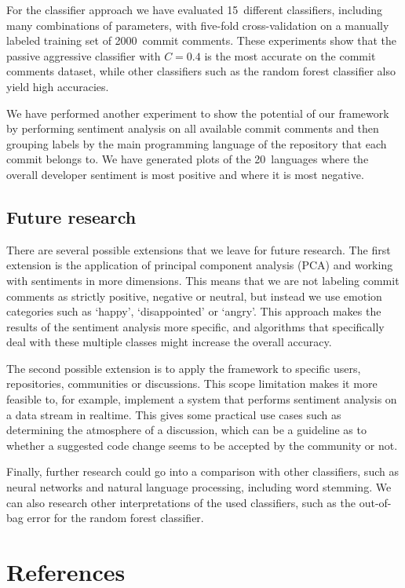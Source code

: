 \documentclass{article}
\begin{document}
For the classifier approach we have evaluated 15~different classifiers,
including many combinations of parameters, with five-fold cross-validation on
a manually labeled training set of 2000~commit comments. These experiments show
that the passive aggressive classifier with $C = 0.4$ is the most accurate on 
the commit comments dataset, while other classifiers such as the random forest 
classifier also yield high accuracies.

We have performed another experiment to show the potential of our framework by
performing sentiment analysis on all available commit comments and then grouping
labels by the main programming language of the repository that each commit
belongs to. We have generated plots of the 20~languages where the overall
developer sentiment is most positive and where it is most negative.

\subsection{Future research}\label{sec:future-research}
There are several possible extensions that we leave for future research. The
first extension is the application of principal component analysis (PCA) and
working with sentiments in more dimensions. This means that we are not labeling
commit comments as strictly positive, negative or neutral, but instead we use
emotion categories such as `happy', `disappointed' or `angry'. This approach
makes the results of the sentiment analysis more specific, and algorithms that 
specifically deal with these multiple classes might increase the overall 
accuracy.

The second possible extension is to apply the framework to specific users,
repositories, communities or discussions. This scope limitation makes it
more feasible to, for example, implement a system that performs sentiment
analysis on a data stream in realtime. This gives some practical use cases such 
as determining the atmosphere of a discussion, which can be a guideline as to 
whether a suggested code change seems to be accepted by the community or not.

Finally, further research could go into a comparison with other classifiers,
such as neural networks and natural language processing, including word 
stemming. We can also research other interpretations of the used classifiers, 
such as the out-of-bag error for the random forest classifier.

\section{References}\label{sec:references}
\printbibliography[heading=none]
\end{document}
